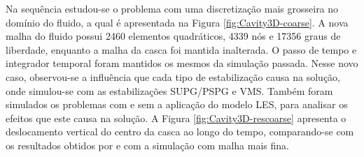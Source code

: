 Na sequência estudou-se o problema com uma discretização mais grosseira no domínio do fluido, a qual é apresentada na Figura \ref{fig:Cavity3D-coarse}. A nova malha do fluido possui 2460 elementos quadráticos, 4339 nós e 17356 graus de liberdade, enquanto a malha da casca foi mantida inalterada. O passo de tempo e integrador temporal foram mantidos os mesmos da simulação passada. Nesse novo caso, observou-se a influência que cada tipo de estabilização causa na solução, onde simulou-se com as estabilizações SUPG/PSPG e VMS. Também foram simulados os problemas com e sem a aplicação do modelo LES, para analisar os efeitos que este causa na solução. A Figura \ref{fig:Cavity3D-rescoarse} apresenta o deslocamento vertical do centro da casca ao longo do tempo, comparando-se com os resultados obtidos por  e com a simulação com malha mais fina.

